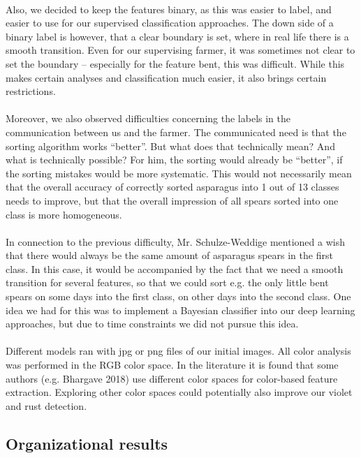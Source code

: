 \\
Also, we decided to keep the features binary, as this was easier to label, and easier to use for our supervised classification approaches. The down side of a binary label is however, that a clear boundary is set, where in real life there is a smooth transition. Even for our supervising farmer, it was sometimes not clear to set the boundary – especially for the feature bent, this was difficult. While this makes certain analyses and classification much easier, it also brings certain restrictions. \\
\\
Moreover, we also observed difficulties concerning the labels in the communication between us and the farmer. The communicated need is that the sorting algorithm works “better”. But what does that technically mean? And what is technically possible? For him, the sorting would already be “better”, if the sorting mistakes would be more systematic. This would not necessarily mean that the overall accuracy of correctly sorted asparagus into 1 out of 13 classes needs to improve, but that the overall impression of all spears sorted into one class is more homogeneous. \\
\\
In connection to the previous difficulty, Mr. Schulze-Weddige mentioned a wish that there would always be the same amount of asparagus spears in the first class. In this case, it would be accompanied by the fact that we need a smooth transition for several features, so that we could sort e.g. the only little bent spears on some days into the first class, on other days into the second class. One idea we had for this was to implement a Bayesian classifier into our deep learning approaches, but due to time constraints we did not pursue this idea. \\
\\
Different models ran with jpg or png files of our initial images. All color analysis was performed in the RGB color space. In the literature it is found that some authors (e.g. Bhargave 2018) use different color spaces for color-based feature extraction. Exploring other color spaces could potentially also improve our violet and rust detection. 




\subsection{Organizational results}
\label{sec:DiscussionOrganization}

